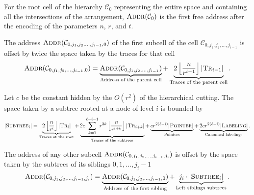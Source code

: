 
For the root cell of the hierarchy
\(\mathcal{C}_0\) representing the entire space and containing all the
intersections of the arrangement, \(\textsc{Addr}(\mathcal{C}_0)\) is the
first free address after the encoding of the parameters \(n\), \(r\), and \(t\).

The address \(\textsc{Addr}(\mathcal{C}_{0,j_1,j_2, \ldots, j_{i-1}, 0})\)
of the first subcell of the cell \(\mathcal{C}_{0,j_1,j_2, \ldots, j_{i-1}}\)
is offset by twice the space taken by the traces for that cell
%
\begin{displaymath}
  \textsc{Addr}(\mathcal{C}_{0,j_1,j_2, \ldots, j_{i-1}, 0})
  =
  \underbrace{\textsc{Addr}(\mathcal{C}_{0,j_1,j_2, \ldots, j_{i-1}})}_{\text{Address of the parent cell}}
  +
  \underbrace{2 \left\lfloor \frac{n}{r^{i-1}} \right\rfloor |\textsc{Tr}_{i-1}|}_{\text{Traces of the parent cell}}
  .
\end{displaymath}

Let \(c\) be the constant hidden by the \(O(r^2)\) of the hierarchical cutting.
%
The space taken by a subtree rooted at a node of level \(i\) is bounded by
\begin{displaymath}
  | \textsc{Subtree}_i |
  =
  \underbrace{2 \left\lfloor \frac{n}{r^{i}} \right\rfloor |\textsc{Tr}_{i}|}_{\text{Traces at the root}}
  +
  \underbrace{2c \sum_{k=1}^{\ell-i-1} r^{2k} \left\lfloor \frac{n}{r^{i+k}}
  \right\rfloor |\textsc{Tr}_{i+k}|}_{\text{Traces of the subtrees}}
  +
  \underbrace{c r^{2(\ell-i)} | \textsc{Pointer} |}_{\text{Pointers}}
  +
  \underbrace{2c r^{2(\ell-i)} | \textsc{Labeling} |}_{\text{Canonical labelings}}.
\end{displaymath}

The address of any other subcell
\(\textsc{Addr}(\mathcal{C}_{0,j_1,j_2, \ldots, j_{i-1}, j_{i}})\)
is offset by the space taken by the subtrees of its siblings \(0, 1, \ldots,
j_{i} - 1\)
%
\begin{displaymath}
  \textsc{Addr}(\mathcal{C}_{0,j_1,j_2, \ldots, j_{i-1}, j_{i}})
  =
  \underbrace{\textsc{Addr}(\mathcal{C}_{0,j_1,j_2, \ldots, j_{i-1}, 0})}_{\text{Address of the first sibling}}
  +
  \underbrace{j_{i} \cdot | \textsc{Subtree}_{i} |}_{\text{Left siblings subtrees}}
  .
\end{displaymath}


